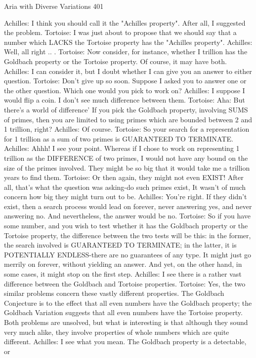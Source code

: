 Aria with Diverse Variations                                                             401

Achilles: I think you should call it the "Achilles property". After all, I suggested the
    problem.
Tortoise: I was just about to propose that we should say that a number which LACKS the
    Tortoise property has the "Achilles property". Achilles: Well, all right .. .
Tortoise: Now consider, for instance, whether I trillion has the Goldbach property or the
    Tortoise property. Of course, it may have both.
Achilles: I can consider it, but I doubt whether I can give you an answer to either
    question.
Tortoise: Don't give up so soon. Suppose I asked you to answer one or the other question.
    Which one would you pick to work on?
Achilles: I suppose I would flip a coin. I don't see much difference between them.
Tortoise: Aha: But there's a world of difference' If you pick the Goldbach property,
    involving SUMS of primes, then you are limited to using primes which are bounded
    between 2 and 1 trillion, right?
Achilles: Of course.
Tortoise: So your search for a representation for 1 trillion as a sum of two primes is
    GUARANTEED TO TERMINATE.
Achilles: Ahhh! I see your point. Whereas if I chose to work on representing 1 trillion as
    the DIFFERENCE of two primes, I would not have any bound on the size of the
    primes involved. They might be so big that it would take me a trillion years to find
    them.
Tortoise: Or then again, they might not even EXIST! After all, that's what the question
    was asking-do such primes exist, It wasn't of much concern how big they might turn
    out to be.
Achilles: You're right. If they didn't exist, then a search process would lead on forever,
    never answering yes, and never answering no. And nevertheless, the answer would
    be no.
Tortoise: So if you have some number, and you wish to test whether it has the Goldbach
    property or the Tortoise property, the difference between the two tests will be this: in
    the former, the search involved is GUARANTEED TO TERMINATE; in the latter,
    it is POTENTIALLY ENDLESS-there are no guarantees of any type. It might just
    go merrily on forever, without yielding an answer. And yet, on the other hand, in
    some cases, it might stop on the first step.
Achilles: I see there is a rather vast difference between the Goldbach and Tortoise
    properties.
Tortoise: Yes, the two similar problems concern these vastly different properties. The
    Goldbach Conjecture is to the effect that all even numbers have the Goldbach
    property; the Goldbach Variation suggests that all even numbers have the Tortoise
    property. Both problems are unsolved, but what is interesting is that although they
    sound very much alike, they involve properties of whole numbers which are quite
    different.
Achilles: I see what you mean. The Goldbach property is a detectable, or




